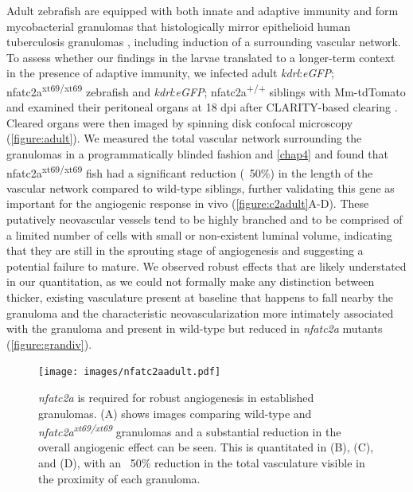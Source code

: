 Adult zebrafish are equipped with both innate and adaptive immunity and form mycobacterial granulomas that histologically mirror epithelioid human tuberculosis granulomas \citep{Swaim2006}, including induction of a surrounding vascular network. To assess whether our findings in the larvae translated to a longer-term context in the presence of adaptive immunity, we infected adult \textit{kdrl}:\textit{eGFP}; nfatc2a\textsuperscript{xt69/xt69} zebrafish and \textit{kdrl}:\textit{eGFP}; nfatc2a\textsuperscript{+/+} siblings with Mm-tdTomato and examined their peritoneal organs at 18 dpi after CLARITY-based clearing \citep{Chung2013, Cronan2015}. Cleared organs were then imaged by spinning disk confocal microscopy (\autoref{figure:adult}). We measured the total vascular network surrounding the granulomas in a programmatically blinded fashion \citep{Salter2016} and \autoref{chap4} and found that nfatc2a\textsuperscript{xt69/xt69} fish had a significant reduction (~50\%) in the length of the vascular network compared to wild-type siblings, further validating this gene as important for the angiogenic response in vivo (\autoref{figure:c2adult}A-D). These putatively neovascular vessels tend to be highly branched and to be comprised of a limited number of cells with small or non-existent luminal volume, indicating that they are still in the sprouting stage of angiogenesis and suggesting a potential failure to mature. We observed robust effects that are likely understated in our quantitation, as we could not formally make any distinction between thicker, existing vasculature present at baseline that happens to fall nearby the granuloma and the characteristic neovascularization more intimately associated with the granuloma and present in wild-type but reduced in \textit{nfatc2a} mutants (\autoref{figure:grandiv}).

\begin{figure}
\centering
\texttt{[image: images/nfatc2aadult.pdf]}
\caption{\textit{nfatc2a} is required for robust angiogenesis in established granulomas. (A) shows images comparing wild-type and \textit{nfatc2a\textsuperscript{xt69/xt69}} granulomas and a substantial reduction in the overall angiogenic effect can be seen. This is quantitated in (B), (C), and (D), with an ~50\% reduction in the total vasculature visible in the proximity of each granuloma.}
\label{figure:c2adult}
\end{figure}

